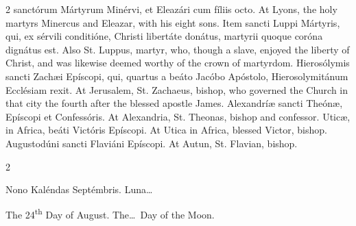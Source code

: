 \begin{paracol}{2}
 sanctórum Mártyrum Minérvi, et Eleazári cum fíliis octo.
\switchcolumn
{}
At Lyons, the holy martyrs Minercus 
 and Eleazar, with his eight sons.
\switchcolumn*
{}
Item sancti Luppi 
 Mártyris, qui, ex sérvili conditióne, Christi libertáte donátus, martyrii 
 quoque coróna dignátus est.
\switchcolumn
{}
Also St. Luppus, martyr, who, though 
 a slave, enjoyed the liberty of Christ, and was likewise deemed worthy of 
 the crown of martyrdom.
\switchcolumn*
{}
Hierosólymis sancti 
 Zachæi Epíscopi, qui, quartus a beáto Jacóbo Apóstolo, Hierosolymitánum 
 Ecclésiam rexit.
\switchcolumn
{}
At Jerusalem, St. Zachaeus, bishop, 
 who governed the Church in that city the fourth after the blessed apostle 
 James.
\switchcolumn*
{}
Alexandríæ sancti 
 Theónæ, Epíscopi et Confessóris.
\switchcolumn
{}
At Alexandria, St. Theonas, bishop 
 and confessor.
\switchcolumn*
{}
Uticæ, in Africa, beáti 
 Victóris Epíscopi.
\switchcolumn
{}
At Utica in Africa, blessed Victor, 
 bishop.
\switchcolumn*
{}
Augustodúni sancti 
 Flaviáni Epíscopi.
\switchcolumn
{}
At Autun, St. Flavian, bishop.
\switchcolumn*
{}
\end{paracol}


\begin{paracol}{2}
\begin{center}{\color{gregoriocolor} Nono Kaléndas Septémbris. 
 Luna\dots\ }\end{center}
\switchcolumn
{}
\begin{center}{\color{gregoriocolor} The 
 24\textsuperscript{th} Day of 
 August. The\dots\ Day of the Moon.}\end{center}
\end{paracol}

